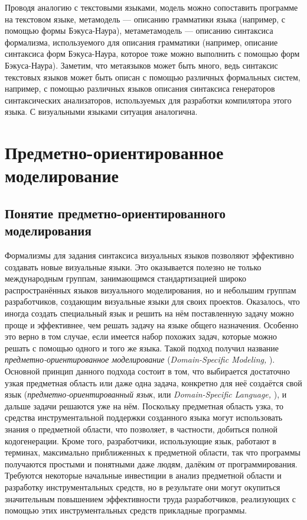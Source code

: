 Проводя аналогию с текстовыми языками, модель можно сопоставить программе на 
текстовом языке, метамодель --- описанию грамматики языка (например, с помощью
формы Бэкуса-Наура), метаметамодель --- описанию синтаксиса формализма, 
используемого для описания грамматики (например, описание синтаксиса форм 
Бэкуса-Наура, которое тоже можно выполнить с помощью форм Бэкуса-Наура). 
Заметим, что метаязыков может быть много, ведь синтаксис текстовых языков может 
быть описан с помощью различных формальных систем, например, с помощью различных 
языков описания синтаксиса генераторов синтаксических анализаторов, используемых 
для разработки компилятора этого языка. С визуальными языками ситуация 
аналогична.

\section{Предметно-ориентированное моделирование}
\subsection{Понятие предметно-ориентированного моделирования}
Формализмы для задания синтаксиса визуальных языков позволяют эффективно 
создавать новые визуальные языки. Это оказывается полезно не только 
международным группам, занимающимся стандартизацией широко распространённых 
языков визуального моделирования, но и небольшим группам разработчиков, 
создающим визуальные языки для своих проектов. Оказалось, что иногда создать 
специальный язык и решить на нём поставленную задачу можно проще и эффективнее, 
чем решать задачу на языке общего назначения. Особенно это верно в том случае, 
если имеется набор похожих задач, которые можно решать с помощью одного и того 
же языка. Такой подход получил название \textit{предметно-ориентированное моделирование} 
(\textit{Domain-Specific Modeling, }). Основной принцип данного подхода состоит в том, 
что выбирается достаточно узкая предметная область или даже одна задача, 
конкретно для неё создаётся свой язык (\textit{предметно-ориентированный язык}, или 
\textit{Domain-Specific Language, }), и дальше задачи решаются уже на нём. Поскольку 
предметная область узка, то средства инструментальной поддержки созданного языка 
могут использовать знания о предметной области, что позволяет, в частности, 
добиться полной кодогенерации. Кроме того, разработчики, использующие язык, 
работают в терминах, максимально приближенных к предметной области, так что 
программы получаются простыми и понятными даже людям, далёким от 
программирования. Требуются некоторые начальные инвестиции в анализ предметной области
и разработку инструментальных средств, но в результате они могут окупиться значительным 
повышением эффективности труда разработчиков, реализующих с помощью этих инструментальных
средств прикладные программы.

